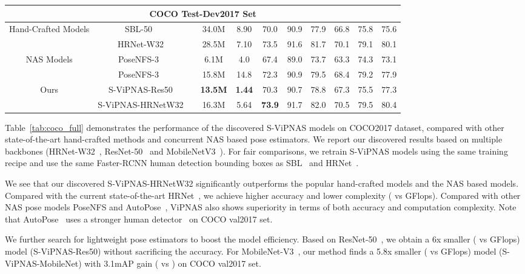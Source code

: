 \documentclass[final]{cvpr}
\begin{document}
\begin{table*}[tb]
\begin{center}
{\begin{tabular}{ c | c | c | c | c | c c c c c c}
    \multicolumn{11}{c}{COCO Test-Dev2017 Set} \\\hline
    \multirow{2}{*}{Hand-Crafted Models} & SBL-50~\cite{xiao2018simple} &  & 34.0M & 8.90 & 70.0 & 90.9 & 77.9 & 66.8 & 75.8 & 75.6 \\ 
    ~ & HRNet-W32\cite{sun2019deep} &  & 28.5M & 7.10 & 73.5 & 91.6 & 81.7 & 70.1 & 79.1 & 80.1 \\ \hline
    \multirow{2}{*}{NAS Models} & PoseNFS-3~\cite{yang2019pose} &  & 6.1M & 4.0 & 67.4 & 89.0 & 73.7 & 63.3 & 74.3 & 73.1 \\ 
     ~ & PoseNFS-3~\cite{yang2019pose} &  & 15.8M & 14.8  & 72.3 & 90.9 & 79.5 & 68.4 & 79.2 & 77.9 \\ \hline
    \multirow{2}{*}{Ours} & S-ViPNAS-Res50 &  & \textbf{13.5M} & \textbf{1.44} & 70.3  & 90.7 & 78.8 & 67.3 & 75.5 & 77.3 \\ 
    ~ & S-ViPNAS-HRNetW32 &  & 16.3M & 5.64 & \textbf{73.9} & 91.7 & 82.0 & 70.5 & 79.5 & 80.4 \\ \hline
    \end{tabular}
}
\label{tab:coco_full}
\end{center}
\vspace{-8pt}
\end{table*}

Table~\ref{tab:coco_full} demonstrates the performance of the discovered S-ViPNAS models on COCO2017 dataset, compared with other state-of-the-art hand-crafted methods and concurrent NAS based pose estimators. We report our discovered results based on multiple backbones (\ie HRNet-W32~\cite{sun2019deep}, ResNet-50~\cite{he2016deep} and MobileNetV3~\cite{howard2019searching}). For fair comparisons, we retrain S-ViPNAS models using the same training recipe and use the same Faster-RCNN human detection bounding boxes as SBL~\cite{xiao2018simple} and HRNet~\cite{sun2019deep}.

We see that our discovered S-ViPNAS-HRNetW32 significantly outperforms the popular hand-crafted models and the NAS based models.
Compared with the current state-of-the-art HRNet~\cite{sun2019deep}, we achieve higher accuracy and lower complexity ( vs  GFlops). Compared with other NAS pose models PoseNFS \cite{yang2019pose} and AutoPose~\cite{gong2020autopose}, ViPNAS also shows superiority in terms of both accuracy and computation complexity.
Note that AutoPose~\cite{gong2020autopose} uses a stronger human detector~\cite{chen2019hybrid} on COCO val2017 set.

We further search for lightweight pose estimators to boost the model efficiency. Based on ResNet-50~\cite{xiao2018simple}, we obtain a 6x smaller ( vs  GFlops) model (S-ViPNAS-Res50) without sacrificing the accuracy. For MobileNet-V3~\cite{howard2019searching}, our method finds a 5.8x smaller ( vs  GFlops) model (S-ViPNAS-MobileNet) with 3.1mAP gain ( vs ) on COCO val2017 set.
\end{document}
